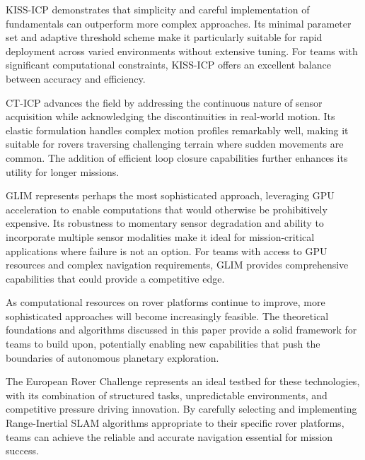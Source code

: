 \documentclass[journal]{IEEEtran}
\begin{document}
KISS-ICP demonstrates that simplicity and careful implementation of fundamentals can outperform more complex approaches. Its minimal parameter set and adaptive threshold scheme make it particularly suitable for rapid deployment across varied environments without extensive tuning. For teams with significant computational constraints, KISS-ICP offers an excellent balance between accuracy and efficiency.

CT-ICP advances the field by addressing the continuous nature of sensor acquisition while acknowledging the discontinuities in real-world motion. Its elastic formulation handles complex motion profiles remarkably well, making it suitable for rovers traversing challenging terrain where sudden movements are common. The addition of efficient loop closure capabilities further enhances its utility for longer missions.

GLIM represents perhaps the most sophisticated approach, leveraging GPU acceleration to enable computations that would otherwise be prohibitively expensive. Its robustness to momentary sensor degradation and ability to incorporate multiple sensor modalities make it ideal for mission-critical applications where failure is not an option. For teams with access to GPU resources and complex navigation requirements, GLIM provides comprehensive capabilities that could provide a competitive edge.

As computational resources on rover platforms continue to improve, more sophisticated approaches will become increasingly feasible. The theoretical foundations and algorithms discussed in this paper provide a solid framework for teams to build upon, potentially enabling new capabilities that push the boundaries of autonomous planetary exploration.

The European Rover Challenge represents an ideal testbed for these technologies, with its combination of structured tasks, unpredictable environments, and competitive pressure driving innovation. By carefully selecting and implementing Range-Inertial SLAM algorithms appropriate to their specific rover platforms, teams can achieve the reliable and accurate navigation essential for mission success.
\end{document}

